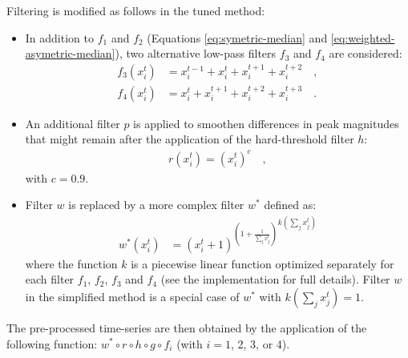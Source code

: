 \documentclass[wcp]{jmlr}
\begin{document}
Filtering is modified as follows in the tuned method:
\begin{itemize}
\item In addition to $f_1$ and $f_2$ (Equations \ref{eq:symetric-median} and
  \ref{eq:weighted-asymetric-median}), two alternative low-pass filters $f_3$
  and $f_4$ are considered:
\begin{align}
f_3(x^t_i) &= x^{t-1}_i + x^{t}_i + x^{t+1}_i + x^{t+2}_i\quad, \label{eq:asymetric-median-forward} \\
f_4(x^t_i) &=  x_i^t + x^{t+1}_i  + x^{t+2}_i + x^{t+3}_i\quad. \label{eq:asymetric-median}
\end{align}
\item An additional filter $p$ is applied to smoothen differences in peak magnitudes
  that might remain after the application of the hard-threshold filter $h$:
\begin{align}
r(x^t_i) = (x_i^t)^c\quad,
\end{align}
with $c=0.9$.
\item Filter $w$ is replaced by a more complex filter $w^*$ defined as:
\begin{align}
 w^*(x^{t}_i) &= {(x^{t}_i + 1 )^{\left (1 + \frac{1}{\sum_{j} x^{t}_j}\right )}}^{k(\sum_{j} x^{t}_j)}
\end{align}
where the function $k$ is a piecewise linear function optimized separately for
each filter $f_1$, $f_2$, $f_3$ and $f_4$ (see the implementation for full
details). Filter $w$ in the simplified method is a special case of $w^*$ with
$k(\sum_j x_j^t)=1$.
\end{itemize}
The pre-processed time-series are then obtained by the application of the
following function: $w^*\circ r \circ h \circ g \circ f_i$ (with $i=1$, 2, 3, or 4).

\end{document}
